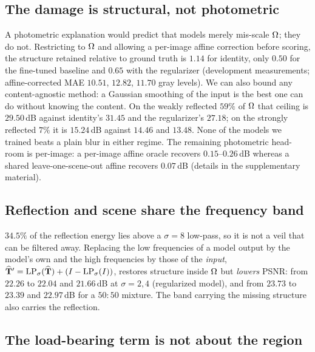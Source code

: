 \subsection{The damage is structural, not photometric}
\label{sec:structural}

A photometric explanation would predict that models merely mis-scale $\Omega$; they do not.
Restricting to $\Omega$ and allowing a per-image affine correction before scoring, the
structure retained relative to ground truth is $1.14$ for identity, only $0.50$ for the
fine-tuned baseline and $0.65$ with the regularizer (development measurements;
affine-corrected MAE $10.51$, $12.82$, $11.70$ gray levels). We can also bound any content-agnostic method: a Gaussian smoothing
of the input is the best one can do without knowing the content. On the weakly reflected
$59\%$ of $\Omega$ that ceiling is $29.50$\,dB against identity's $31.45$ and the
regularizer's $27.18$; on the strongly reflected $7\%$ it is $15.24$\,dB against $14.46$
and $13.48$. None of the models we trained beats a plain blur in either regime. The
remaining photometric head-room is per-image: a per-image affine oracle recovers
$0.15$--$0.26$\,dB whereas a shared leave-one-scene-out affine recovers $0.07$\,dB
(details in the supplementary material).

\subsection{Reflection and scene share the frequency band}
\label{sec:band}

$34.5\%$ of the reflection energy lies above a $\sigma{=}8$ low-pass, so it is not a veil
that can be filtered away. Replacing the low frequencies of a model output by the model's
own and the high frequencies by those of the \emph{input},
$\widehat{\mathbf{T}}'=\mathrm{LP}_\sigma(\widehat{\mathbf{T}})+(I-\mathrm{LP}_\sigma(I))$, restores structure inside
$\Omega$ but \emph{lowers} PSNR: from $22.26$ to $22.04$ and $21.66$\,dB at $\sigma{=}2,4$
(regularized model), and from $23.73$ to $23.39$ and $22.97$\,dB for a $50{:}50$
mixture. The band carrying the missing structure also carries the reflection.

\subsection{The load-bearing term is not about the region}
\label{sec:axis3}

